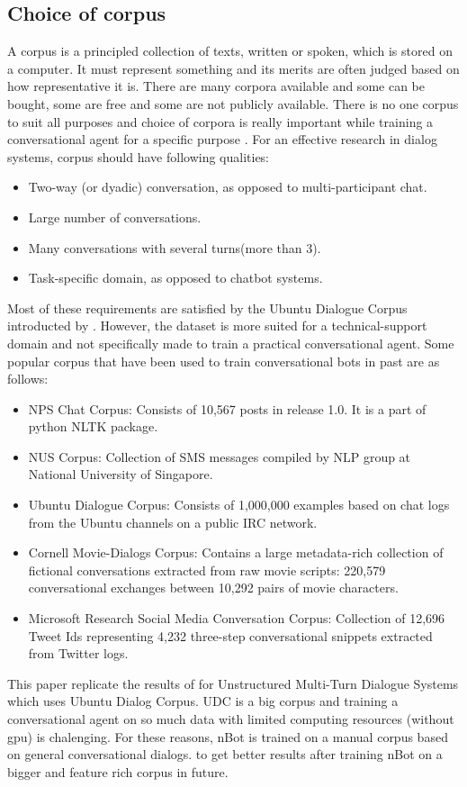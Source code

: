 \documentclass[letterpaper] {article} %
\begin{document}
\subsection{Choice of corpus}
A corpus is a principled collection of texts, written or spoken, which is stored on a computer. It must represent something and its merits are often judged based on how representative it is. There are many corpora available and some can be bought, some are free and some are not publicly available. There is no one corpus to suit all purposes and choice of corpora is really important while training a conversational agent for a specific purpose \cite{o2007corpus}. For an effective research in dialog systems, corpus should have following qualities:
\begin{itemize}
	\item Two-way (or dyadic) conversation, as opposed to multi-participant chat.
	\item Large number of conversations.
	\item Many conversations with several turns(more than 3).
	\item Task-specific domain, as opposed to chatbot systems.
\end{itemize}
Most of these requirements are satisfied by the Ubuntu Dialogue Corpus introducted by \cite{lowe2015ubuntu}. However, the dataset is more suited for a technical-support domain and not specifically made to train a practical conversational agent. Some popular corpus that have been used to train conversational bots in past are as follows:
\begin{itemize}
	\item NPS Chat Corpus: Consists of 10,567 posts in release 1.0. It is a part of python NLTK package.
	\item NUS Corpus: Collection of SMS messages compiled by NLP group at National University of Singapore.
	\item Ubuntu Dialogue Corpus: Consists of 1,000,000 examples based on chat logs from the Ubuntu channels on a public IRC network.
	\item Cornell Movie-Dialogs Corpus:  Contains a large metadata-rich collection of fictional conversations extracted from raw movie scripts: 220,579 conversational exchanges between 10,292 pairs of movie characters.
	\item Microsoft Research Social Media Conversation Corpus: Collection of 12,696 Tweet Ids representing 4,232 three-step conversational snippets extracted from Twitter logs.
\end{itemize}
This paper replicate the results of \cite{lowe2015ubuntu} for Unstructured Multi-Turn Dialogue Systems which uses Ubuntu Dialog Corpus. UDC is a big corpus and training a conversational agent on so much data with limited computing resources (without gpu) is chalenging. For these reasons, nBot is trained on a manual corpus based on general conversational dialogs. to get better results after training nBot on a bigger and feature rich corpus in future.
\end{document}
